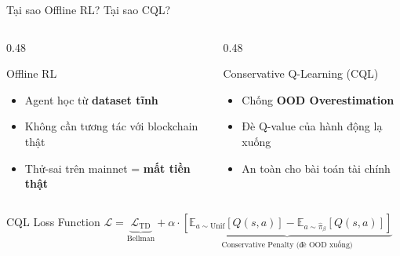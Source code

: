 \documentclass[aspectratio=169, 12pt, xcolor=table]{beamer}
\begin{document}
\begin{frame}{Tại sao Offline RL? Tại sao CQL?}
  \begin{columns}[T]
    \begin{column}{0.48\textwidth}
      \begin{block}{Offline RL}
        \begin{itemize}
          \item Agent học từ \textbf{dataset tĩnh}
          \item Không cần tương tác với blockchain thật
          \item Thử-sai trên mainnet = \textbf{mất tiền thật}
        \end{itemize}
      \end{block}
    \end{column}
    \begin{column}{0.48\textwidth}
      \begin{block}{Conservative Q-Learning (CQL)}
        \begin{itemize}
          \item Chống \textbf{OOD Overestimation}
          \item Đè Q-value của hành động lạ xuống
          \item An toàn cho bài toán tài chính
        \end{itemize}
      \end{block}
    \end{column}
  \end{columns}
  \vspace{1em}
  \begin{block}{CQL Loss Function}
    \centering
    $\mathcal{L} = \underbrace{\mathcal{L}_\text{TD}}_{\text{Bellman}} + \alpha \cdot \underbrace{\left[\mathbb{E}_{a\sim\text{Unif}}\left[Q(s,a)\right] - \mathbb{E}_{a\sim\hat{\pi}_\beta}\left[Q(s,a)\right]\right]}_{\text{Conservative Penalty (đè OOD xuống)}}$
  \end{block}
\end{frame}
\end{document}
